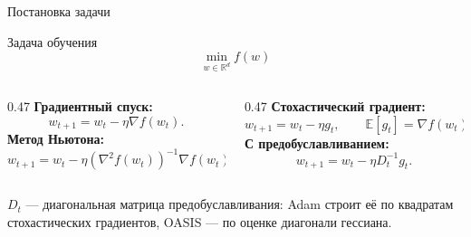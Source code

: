 \documentclass[aspectratio=169, 12pt]{beamer}
\begin{document}
\begin{frame}{Постановка задачи}
\begin{block}{Задача обучения}
    \vspace{-0.4cm}
    \begin{equation*}
        \min_{w \in \mathbb{R}^d} f(w)
    \end{equation*}
    \vspace{-0.5cm}
\end{block}
\vspace{0.3cm}
\small
\begin{columns}[t]
    \begin{column}{0.47\textwidth}
        \textbf{Градиентный спуск:}
        \begin{equation*}
            w_{t+1} = w_t - \eta \nabla f(w_t).
        \end{equation*}
        \textbf{Метод Ньютона:}
        \begin{equation*}
            w_{t+1} = w_t - \eta \left( \nabla^2 f(w_t) \right)^{-1} \nabla f(w_t).
        \end{equation*}
    \end{column}
    \hspace{0.2cm}
    \vrule
    \hspace{0.2cm}
    \begin{column}{0.47\textwidth}
        \textbf{Стохастический градиент:}
        \begin{equation*}
            w_{t+1} = w_t - \eta g_t, \qquad \mathbb{E}\left[g_t\right] = \nabla f(w_t).
        \end{equation*}
        \textbf{С предобуславливанием:}
        \begin{equation*}
            w_{t+1} = w_t - \eta D_t^{-1}g_t.
        \end{equation*}
    \end{column}
\end{columns}
\vspace{0.4cm}
$D_t$ --- диагональная матрица предобуславливания: Adam строит её по квадратам стохастических градиентов, OASIS --- по оценке диагонали гессиана.
\end{frame}
\end{document}
